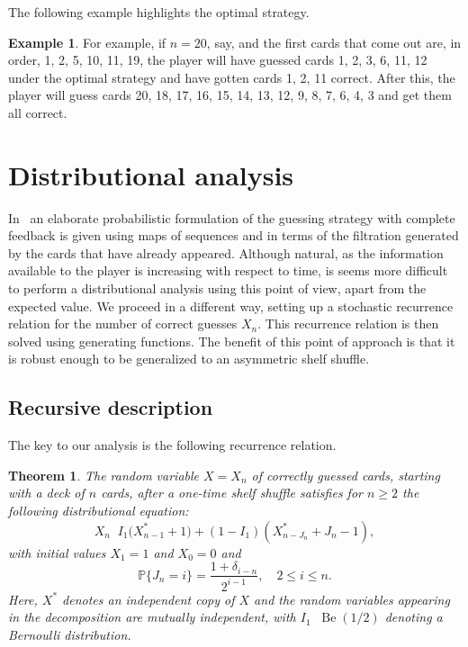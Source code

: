 \documentclass[10pt,reqno,a4paper]{amsart}
\newtheorem{theorem}{Theorem}
\theoremstyle{definition}
\newtheorem{example}{Example}
\def\P{{\mathbb {P}}}
\DeclareMathOperator{\law}{\overset{\mathcal{L}}{=}}
\DeclareMathOperator{\Be}{Be}
\begin{document}
The following example highlights the optimal strategy.
\begin{example}
\label{ex:1}
For example, if $n = 20$, say, and the first cards that come out are, in order, 1, 2, 5, 10, 11, 19, the player will have guessed cards 1, 2, 3, 6, 11, 12
under the optimal strategy and have gotten cards 1, 2, 11 correct. After this, the player will guess cards 20, 18, 17, 16, 15, 14, 13, 12, 9, 8, 7, 6, 4, 3 and get them all correct.
\end{example}

\section{Distributional analysis}
In~\cite{Clay2025a} an elaborate probabilistic formulation of the guessing strategy with complete feedback
is given using maps of sequences and in terms of the
filtration generated by the cards that have already appeared. Although natural, 
as the information available to the player is increasing with respect to time, is seems more difficult to perform a distributional analysis using this point of view, apart from the expected value.
We proceed in a different way, setting up a stochastic recurrence relation for the number of correct guesses $X_n$. This recurrence relation is then solved using generating functions. 
The benefit of this point of approach is that it is robust enough to be generalized to an asymmetric shelf shuffle. 

\subsection{Recursive description}
The key to our analysis is the following recurrence relation.
\begin{theorem}
\label{the:distDecomp}
The random variable $X=X_n$ of correctly guessed cards, starting with a deck of $n$ cards, after a one-time shelf shuffle satisfies for $n\ge 2$ the following distributional equation:
\begin{equation}
\label{eqn:Xn_DistEqn}
X_n \law I_1 \big(X^{\ast}_{n-1}+1\big)+(1-I_1)(X^{\ast}_{n-J_n}+J_n-1), 
\end{equation}
with initial values $X_1=1$ and $X_0=0$ and 
\[
\P\{J_n=i\}=\frac{1+\delta_{i-n}}{2^{i-1}},\quad 2\le i\le n.
\]
Here, $X^{\ast}$ denotes an independent copy of $X$ and the random variables appearing in the decomposition are mutually independent, with $I_1\law \Be(1/2)$ denoting a Bernoulli distribution.
\end{theorem}
\end{document}

